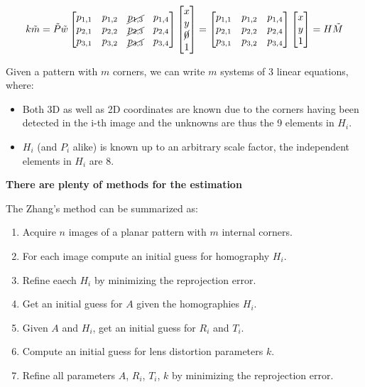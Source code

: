 \documentclass{article}
\begin{document}
$$k\tilde{m} = \tilde{P}\tilde{w}
\begin{bmatrix}
  p_{1,1} & p_{1,2} & \cancel{p_{1,3}} & p_{1,4} \\
  p_{2,1} & p_{2,2} & \cancel{p_{2,3}} & p_{2,4} \\
  p_{3,1} & p_{3,2} & \cancel{p_{3,3}} & p_{3,4} 
\end{bmatrix}
\begin{bmatrix}
x \\ y \\ \cancel{0} \\ 1
\end{bmatrix}
=
\begin{bmatrix}
  p_{1,1} & p_{1,2} & p_{1,4} \\
  p_{2,1} & p_{2,2} & p_{2,4} \\
  p_{3,1} & p_{3,2} & p_{3,4} 
\end{bmatrix}
\begin{bmatrix}
x \\ y \\ 1
\end{bmatrix}
= H\tilde{M}
$$

Given a pattern with $m$ corners, we can write $m$ systems of 3 linear equations, where:
\begin{itemize}
  \item Both 3D as well as 2D coordinates are known due to the corners having been detected in the i-th image and the unknowns are thus the 9 elements in $H_i$.
  \item $H_i$ (and $P_i$ alike) is known up to an arbitrary scale factor, the independent elements in $H_i$ are 8.
\end{itemize}

\textbf{There are plenty of methods for the estimation}

The Zhang's method can be summarized as:
\begin{enumerate}
  \item Acquire $n$ images of a planar pattern with $m$ internal corners.
  \item For each image compute an initial guess for homography $H_i$.
  \item Refine eaech $H_i$ by minimizing the reprojection error.
  \item Get an initial guess for $A$ given the homographies $H_i$.
  \item Given $A$ and $H_i$, get an initial guess for $R_i$ and $T_i$.
  \item Compute an initial guess for lens distortion parameters $k$.
  \item Refine all parameters $A$, $R_i$, $T_i$, $k$ by minimizing the reprojection error.
\end{enumerate}
\end{document}
